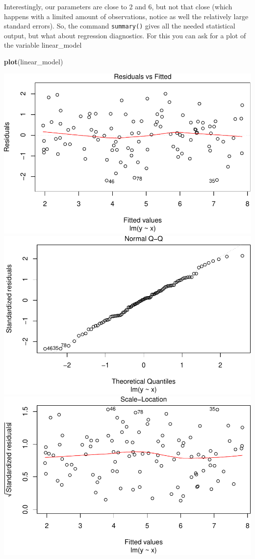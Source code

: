 \documentclass[]{article}
\newenvironment{Shaded}{\begin{snugshade}}{\end{snugshade}}
\newcommand{\KeywordTok}[1]{\textcolor[rgb]{0.13,0.29,0.53}{\textbf{#1}}}
\newcommand{\NormalTok}[1]{#1}
\theoremstyle{definition}
\theoremstyle{definition}
\theoremstyle{definition}
\theoremstyle{remark}
\begin{document}
Interestingly, our parameters are close to 2 and 6, but not that close
(which happens with a limited amount of observations, notice as well the
relatively large standard errors). So, the command \texttt{summary()}
gives all the needed statistical output, but what about regression
diagnostics. For this you can ask for a plot of the variable
linear\_model

\begin{Shaded}
\begin{Highlighting}[]
\KeywordTok{plot}\NormalTok{(linear_model)}
\end{Highlighting}
\end{Shaded}

\includegraphics{./unnamed-chunk-26-1.pdf}
\includegraphics{./unnamed-chunk-26-2.pdf}
\includegraphics{./unnamed-chunk-26-3.pdf}
\end{document}

